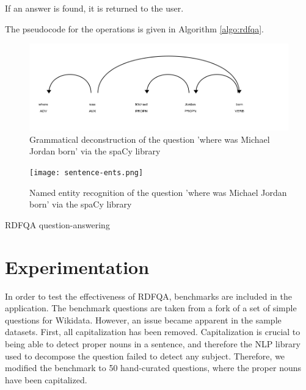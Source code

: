 \documentclass[sigplan,screen]{acmart}
\begin{document}
If an answer is found, it is returned to the user.

The pseudocode for the operations is given in Algorithm \ref{algo:rdfqa}.

\begin{figure}[h]
  \includegraphics[width=\columnwidth]{sentence-deps.png}
  \caption{Grammatical deconstruction of the question 'where was Michael Jordan born' via the spaCy library}
  \label{figure:sentence-deps}
\end{figure}

\begin{figure}[h]
  \texttt{[image: sentence-ents.png]}
  \caption{Named entity recognition of the question 'where was Michael Jordan born' via the spaCy library}
  \label{figure:sentence-ents}
\end{figure}

\begin{algorithm}[h]
\SetAlgoLined
{}
 \caption{RDFQA question-answering}
 \label{algo:rdfqa}
\end{algorithm}

\section{Experimentation}

In order to test the effectiveness of RDFQA, benchmarks are included in the application. The benchmark questions are taken from a fork of a set of simple questions for Wikidata. However, an issue became apparent in the sample datasets. First, all capitalization has been removed. Capitalization is crucial to being able to detect proper nouns in a sentence, and therefore the NLP library used to decompose the question failed to detect any subject. Therefore, we modified the benchmark to 50 hand-curated questions, where the proper nouns have been capitalized.
\end{document}
